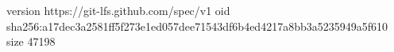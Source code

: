 version https://git-lfs.github.com/spec/v1
oid sha256:a17dec3a2581ff5f273e1ed057dee71543df6b4ed4217a8bb3a5235949a5f610
size 47198
